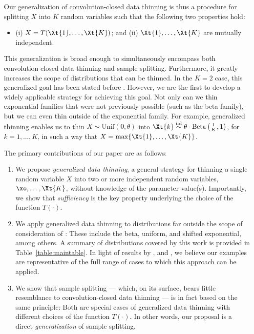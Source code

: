 \documentclass[12pt]{article}
\begin{document}
Our generalization of convolution-closed data thinning is thus a procedure for splitting $X$ into $K$ random variables such that  the following two properties hold: 

\begin{itemize}
  \item[] (i) $X=T(\Xt{1},\ldots,\Xt{K})$; and (ii) $\Xt{1},\ldots,\Xt{K}$ are mutually independent.
\end{itemize}

This generalization is broad enough to simultaneously encompass both convolution-closed data thinning and sample splitting. Furthermore, it greatly increases the scope of distributions that can be thinned. In the $K=2$ case, this generalized goal has been stated before \citep[see][``P1'' property]{leiner2022data}. However, we are the first to develop a widely applicable strategy for achieving this goal. Not only can we thin exponential families that were not previously possible (such as the  beta family), but we can even thin outside of the exponential family.  For example, generalized thinning enables us to thin $X \sim \text{Unif}(0, \theta)$ into
 $\Xt{k} \overset{\text{iid}}{\sim} \theta \cdot\text{Beta}\left(\frac{1}{K},1\right)$, for $k=1,\dots,K$, in such a way that $X=\max\{\Xt{1},\ldots,\Xt{K}\}$.




The primary contributions of our paper are as follows:
\begin{enumerate}
\item We propose \emph{generalized data thinning}, a general strategy for thinning a single random variable $X$ into two or more independent random variables, $\xo,\ldots,\Xt{K}$, without knowledge of the parameter value(s).  
Importantly, we show that {\em sufficiency} is the key property underlying the choice of the function $T(\cdot)$.
\item We apply generalized data thinning to distributions far outside the scope of consideration of \cite{neufeld2023data}: These include the beta, uniform, and shifted exponential, among others.  A summary of distributions covered by this work is provided in Table~\ref{table:maintable}.  In light of results by \cite{darmois, koopman}, and \cite{pitman_1936}, we believe our examples are representative of the full range of cases to which this approach can be applied. 
\item We show that sample splitting --- which, on its surface, bears little resemblance to convolution-closed data thinning --- is in fact based on the same principle: Both are special cases of generalized data thinning with different choices of the function $T(\cdot)$.  In other words, our proposal is a direct \emph{generalization} of sample splitting. 
\end{enumerate}
\end{document}
